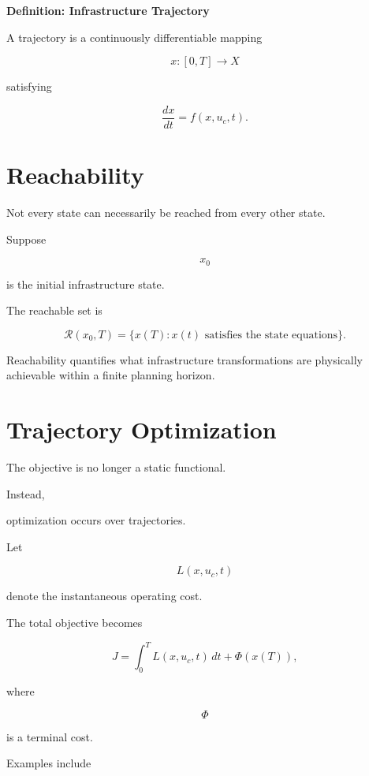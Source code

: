 \documentclass[11pt,fleqn]{book}
\numberwithin{equation}{chapter}
\newenvironment{definition}[1]
  {\begin{definitionEnv}
   \noindent\textbf{Definition: #1}\par\smallskip}
  {\end{definitionEnv}}
\theoremstyle{plain}
\theoremstyle{definition}
\theoremstyle{remark}
\begin{document}
\begin{definition}{Infrastructure Trajectory}

A trajectory is a continuously differentiable mapping

\[
x:[0,T]\rightarrow X
\]

satisfying

\[
\frac{dx}{dt}
=
f(x,u_c,t).
\]

\end{definition}


\section{Reachability}

Not every state can necessarily be reached from every other state.

Suppose

\[
x_0
\]

is the initial infrastructure state.

The reachable set is

\[
\mathcal R(x_0,T)
=
\{
x(T):
x(t)
\text{ satisfies the state equations}
\}.
\]

Reachability quantifies what infrastructure transformations are
physically achievable within a finite planning horizon.


\section{Trajectory Optimization}

The objective is no longer a static functional.

Instead,

optimization occurs over trajectories.

Let

\[
L(x,u_c,t)
\]

denote the instantaneous operating cost.

The total objective becomes

\[
\boxed{
J
=
\int_0^T
L(x,u_c,t)\,dt
+
\Phi(x(T)),
}
\]

where

\[
\Phi
\]

is a terminal cost.

Examples include
\end{document}
